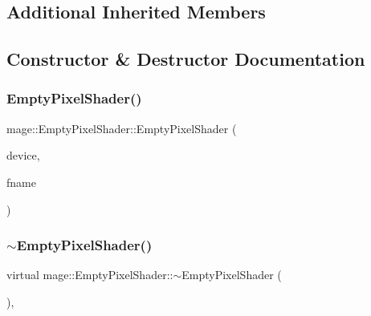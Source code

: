 \subsection*{Additional Inherited Members}


\subsection{Constructor \& Destructor Documentation}
\hypertarget{classmage_1_1_empty_pixel_shader_a1003302597502cd86cf7aa4f110c19f4}{}\label{classmage_1_1_empty_pixel_shader_a1003302597502cd86cf7aa4f110c19f4} 
\subsubsection{\texorpdfstring{Empty\+Pixel\+Shader()}{EmptyPixelShader()}\hspace{0.1cm}{\footnotesize\ttfamily [1/2]}}
{\footnotesize\ttfamily mage\+::\+Empty\+Pixel\+Shader\+::\+Empty\+Pixel\+Shader (\begin{DoxyParamCaption}\item[{const \hyperlink{classmage_1_1_rendering_device}{Rendering\+Device} \&}]{device,  }\item[{const wstring \&}]{fname }\end{DoxyParamCaption})}

\hypertarget{classmage_1_1_empty_pixel_shader_ace5053e12d6fa60caa2bcca00d192fab}{}\label{classmage_1_1_empty_pixel_shader_ace5053e12d6fa60caa2bcca00d192fab} 
\subsubsection{\texorpdfstring{$\sim$\+Empty\+Pixel\+Shader()}{~EmptyPixelShader()}}
{\footnotesize\ttfamily virtual mage\+::\+Empty\+Pixel\+Shader\+::$\sim$\+Empty\+Pixel\+Shader (\begin{DoxyParamCaption}{ }\end{DoxyParamCaption})\hspace{0.3cm}{\ttfamily [virtual]}, {\ttfamily [default]}}


